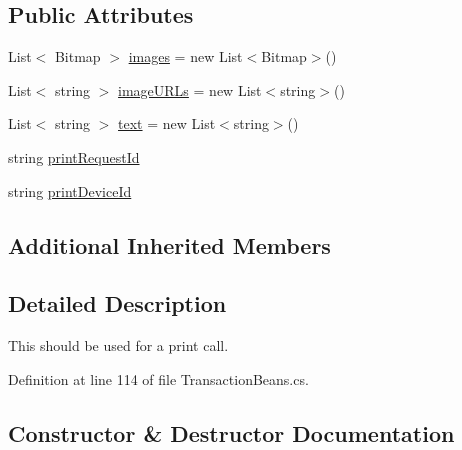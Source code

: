 \subsection*{Public Attributes}
\begin{DoxyCompactItemize}
\item 
List$<$ Bitmap $>$ \hyperlink{classcom_1_1clover_1_1remotepay_1_1sdk_1_1_print_request_aa33c8be7efaa3726d2f71a2df1e4020d}{images} = new List$<$Bitmap$>$()
\item 
List$<$ string $>$ \hyperlink{classcom_1_1clover_1_1remotepay_1_1sdk_1_1_print_request_a6f099f7ac1fa4ed005a266103b74264c}{image\+U\+R\+Ls} = new List$<$string$>$()
\item 
List$<$ string $>$ \hyperlink{classcom_1_1clover_1_1remotepay_1_1sdk_1_1_print_request_ad10de4093d7e4f95539de84ba1ada767}{text} = new List$<$string$>$()
\item 
string \hyperlink{classcom_1_1clover_1_1remotepay_1_1sdk_1_1_print_request_a935f0aed3de84a482fd0fb4a84027acc}{print\+Request\+Id}
\item 
string \hyperlink{classcom_1_1clover_1_1remotepay_1_1sdk_1_1_print_request_ab0198507ca2b0478d0406d20d3eceb3e}{print\+Device\+Id}
\end{DoxyCompactItemize}
\subsection*{Additional Inherited Members}


\subsection{Detailed Description}
This should be used for a print call. 



Definition at line 114 of file Transaction\+Beans.\+cs.



\subsection{Constructor \& Destructor Documentation}
\mbox{\label{classcom_1_1clover_1_1remotepay_1_1sdk_1_1_print_request_a40305efe6c6354d8e994f22767c94c19}} 
